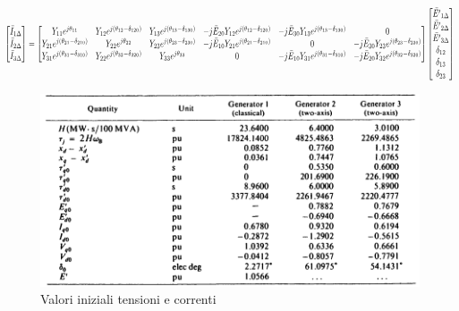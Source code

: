 \documentclass[Lau,noexaminfo]{sapthesis}
\begin{document}
	\begin{equation}
	\resizebox{1.1\hsize}{0.06\vsize}{$%
		\begin{bmatrix}
		\bar{I}_{1\Delta}\\
		\bar{I}_{2\Delta}\\
		\bar{I}_{3\Delta}\\
		\end{bmatrix}=
		\begin{bmatrix}
		Y_{11}e^{j\theta_{11}} & Y_{12}e^{j(\theta_{12}-\delta_{120})} & Y_{13}e^{j(\theta_{13}-\delta_{130})} & -j\bar{E}_{20}Y_{12}e^{j(\theta_{12}-\delta_{120})} & -j\bar{E}_{30}Y_{13}e^{j(\theta_{13}-\delta_{130})} & 0\\
		Y_{21}e^{j(\theta_{21}-\delta_{210})} & Y_{22}e^{j\theta_{22}} & Y_{23}e^{j(\theta_{23}-\delta_{230})} & -j\bar{E}_{10}Y_{21}e^{j(\theta_{21}-\delta_{210})} & 0 & -j\bar{E}_{30}Y_{23}e^{j(\theta_{23}-\delta_{230})}\\
		Y_{31}e^{j(\theta_{31}-\delta_{310})} & Y_{22}e^{j(\theta_{32}-\delta_{320})} & Y_{33}e^{j\theta_{33}} & 0 & -j\bar{E}_{10}Y_{31}e^{j(\theta_{31}-\delta_{310})} & -j\bar{E}_{20}Y_{32}e^{j(\theta_{32}-\delta_{320})}\\
		\end{bmatrix}
		\begin{bmatrix}
		\bar{E'}_{1\Delta}\\
		\bar{E'}_{2\Delta}\\
		\bar{E'}_{3\Delta}\\
		\delta_{12}\\
		\delta_{13}\\
		\delta_{23}
		\end{bmatrix}
		$%
	}%
	\end{equation}
	\begin{figure}
		\centering
		\includegraphics[height=0.32\textheight]{valori_loaflow1}
		\caption{Valori iniziali tensioni e correnti}
	\end{figure}
\end{document}
